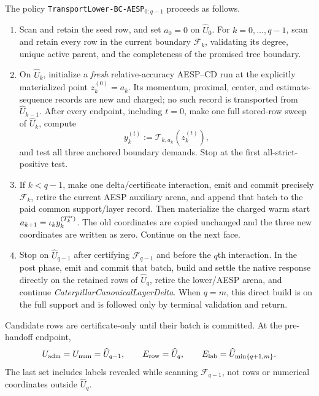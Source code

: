 \begin{definition}
\label{def:branch-caterpillar-transported-lower-policy}
The policy
\texttt{TransportLower-BC-AESP}$_{0:q-1}$ proceeds as follows.
\begin{enumerate}
 \item Scan and retain the seed row, and set $a_0=0$ on
       $\widehat U_0$.  For
       $k=0,\ldots,q-1$, scan and retain every row in the current boundary
       $\mathcal F_k$, validating its degree, unique active parent, and the
       completeness of the promised tree boundary.
 \item On $\widehat U_k$, initialize a \emph{fresh} relative-accuracy
       AESP--CD run at the explicitly materialized point
       $z_k^{(0)}=a_k$.  Its momentum, proximal, center, and
       estimate-sequence records are new and charged; no such record is
       transported from $\widehat U_{k-1}$.  After every endpoint, including
       $t=0$, make one full stored-row sweep of $\widehat U_k$, compute
       \[
       y_k^{(t)}:=\mathcal T_{k,a_k}(z_k^{(t)}),
       \]
       and test all three anchored boundary demands.  Stop at the first
       all-strict-positive test.
 \item If $k<q-1$, make one delta/certificate interaction, emit and commit
       precisely $\mathcal F_k$, retire the current AESP auxiliary arena, and
       append that batch to the paid common support/layer record.  Then
       materialize the charged warm start
       $a_{k+1}=\iota_k y_k^{(T_k^{\rm tr})}$.  The old coordinates are copied
       unchanged and the three new coordinates are written as zero.  Continue
       on the next face.
 \item Stop on $\widehat U_{q-1}$ after certifying
       $\mathcal F_{q-1}$ and before the $q$th interaction.  In the post phase,
       emit and commit that batch, build and settle the native response
       directly on the retained rows of $\widehat U_q$, retire the lower/AESP
       arena, and continue
       \emph{CaterpillarCanonicalLayerDelta}.  When $q=m$, this direct build is
       on the full support and is followed only by terminal validation and
       return.
\end{enumerate}
Candidate rows are certificate-only until their batch is committed.  At the
pre-handoff endpoint,
\begin{equation}
 U_{\rm adm}=U_{\rm num}=\widehat U_{q-1},
 \qquad E_{\rm row}=\widehat U_q,
 \qquad
 E_{\rm lab}=\widehat U_{\min\{q+1,m\}}.
 \label{eq:branch-caterpillar-transported-lower-arenas}
\end{equation}
The last set includes labels revealed while scanning $\mathcal F_{q-1}$, not
rows or numerical coordinates outside $\widehat U_q$.
\end{definition}


